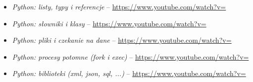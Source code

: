 % 
% 
% 
% 

\begin{itemize}
\item \emph{Python: listy, typy i referencje} – \url{https://www.youtube.com/watch?v=}
\item \emph{Python: słowniki i klasy} – \url{https://www.youtube.com/watch?v=}
\item \emph{Python: pliki i czekanie na dane} – \url{https://www.youtube.com/watch?v=}
\item \emph{Python: procesy potomne (fork i exec)} – \url{https://www.youtube.com/watch?v=}
\item \emph{Python: biblioteki (xml, json, sql, ...)} – \url{https://www.youtube.com/watch?v=}
\end{itemize}
